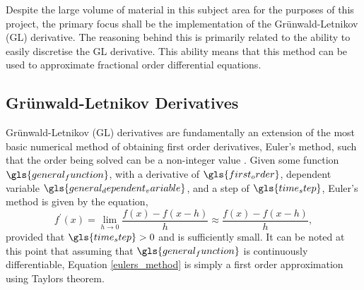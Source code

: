 Despite the large volume of material in this subject area for the purposes of this project, the primary focus shall be the implementation of the Gr\"{u}nwald-Letnikov (GL) derivative. The reasoning behind this is primarily related to the ability to easily discretise the GL derivative. This ability means that this method can be used to approximate fractional order differential equations.

\subsection{Gr\"{u}nwald-Letnikov Derivatives} \label{gl_derivatives}

Gr\"{u}nwald-Letnikov (GL) derivatives are fundamentally an extension of the most basic numerical method of obtaining first order derivatives, Euler's method, such that the order being solved can be a non-integer value \cite{the_fractional_calculus, euler1794institutiones}. Given some function $\gls{general_function}$, with a derivative of $\gls{first_order}$, dependent variable $\gls{general_dependent_variable}$, and a step of $\gls{time_step}$, Euler's method is given by the equation,
\begin{equation}\label{eulers_method}
	f^{\prime}(x) = \lim_{h \to 0} \frac{f(x)-f(x-h)}{h} \approx \frac{f(x)-f(x-h)}{h},
\end{equation} 
provided that $\gls{time_step} > 0$ and is sufficiently small. It can be noted at this point that assuming that $\gls{general_function}$ is continuously differentiable, Equation \ref{eulers_method} is simply a first order approximation using Taylors theorem. 

